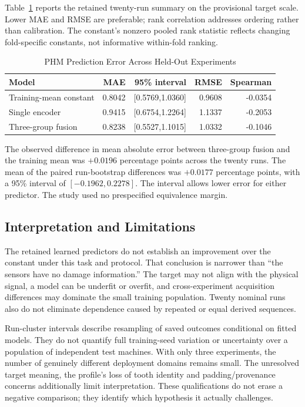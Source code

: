 Table~\ref{tab:phm-loeo} reports the retained twenty-run summary on the provisional
target scale. Lower MAE and RMSE are preferable; rank correlation addresses ordering
rather than calibration. The constant's nonzero pooled rank statistic reflects changing
fold-specific constants, not informative within-fold ranking.

\begin{table}[htbp]
\caption{PHM Prediction Error Across Held-Out Experiments}\label{tab:phm-loeo}
\centering\small
\begin{tabular}{lrrrr}\toprule
Model & MAE & 95\% interval & RMSE & Spearman\\\midrule
Training-mean constant &0.8042 &[0.5769,1.0360]&0.9608&-0.0354\\
Single encoder &0.9415 &[0.6754,1.2264]&1.1337&-0.2053\\
Three-group fusion &0.8238 &[0.5527,1.1015]&1.0332&-0.1046\\\bottomrule
\end{tabular}
\end{table}

The observed difference in mean absolute error between three-group fusion and the
training mean was $+0.0196$ percentage points across the twenty runs. The mean of the
paired run-bootstrap differences was $+0.0177$ percentage points, with a 95\% interval
of $[-0.1962,0.2278]$. The interval allows lower error for either predictor. The study
used no prespecified equivalence margin.

\subsection{Interpretation and Limitations}
The retained learned predictors do not establish an improvement over the constant under
this task and protocol. That conclusion is narrower than ``the sensors have no damage
information.'' The target may not align with the physical signal, a model can be
underfit or overfit, and cross-experiment acquisition differences may dominate the small
training population. Twenty nominal runs also do not eliminate dependence caused by
repeated or equal derived sequences.

Run-cluster intervals describe resampling of saved outcomes conditional on fitted
models. They do not quantify full training-seed variation or uncertainty over a
population of independent test machines. With only three experiments, the number of
genuinely different deployment domains remains small. The unresolved target meaning, the
profile's loss of tooth identity and padding/provenance concerns additionally limit
interpretation. These qualifications do not erase a negative comparison; they identify
which hypothesis it actually challenges.

